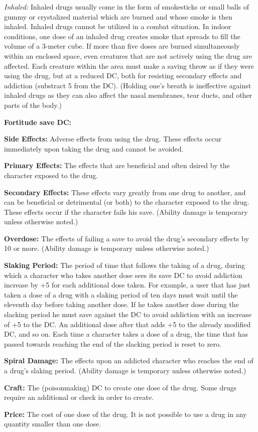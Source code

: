 \textit{Inhaled:} Inhaled drugs usually come in the form of smokesticks or small balls of gummy or crystalized material which are burned and whose smoke is then inhaled. Inhaled drugs cannot be utilized in a combat situation. In indoor conditions, one dose of an inhaled drug creates smoke that spreads to fill the volume of a 3-meter cube. If more than five doses are burned simultaneously within an enclosed space, even creatures that are not actively using the drug are affected. Each creature within the area must make a saving throw as if they were using the drug, but at a reduced DC, both for resisting secondary effects and addiction (substract 5 from the DC). (Holding one’s breath is ineffective against inhaled drugs as they can also affect the nasal membranes, tear ducts, and other parts of the body.)

\textbf{Fortitude save DC: }

\textbf{Side Effects:} Adverse effects from using the drug. These effects occur immediately upon taking the drug and cannot be avoided.

\textbf{Primary Effects:} The effects that are beneficial and often dsired by the character exposed to the drug.

\textbf{Secondary Effects:} These effects vary greatly from one drug to another, and can be beneficial or detrimental (or both) to the character exposed to the drug. These effects occur if the character fails his save. (Ability damage is temporary unless otherwise noted.)

\textbf{Overdose:} The effects of failing a save to avoid the drug’s secondary effects by 10 or more. (Ability damage is temporary unless otherwise noted.)

\textbf{Slaking Period:} The period of time that follows the taking of a drug, during which a character who takes another dose sees its save DC to avoid addiction increase by +5 for each additional dose taken. For example, a user that has just taken a dose of a drug with a slaking period of ten days must wait until the eleventh day before taking another dose. If he takes another dose during the slacking period he must save against the DC to avoid addiction with an increase of +5 to the DC. An additional dose after that adds +5 to the already modified DC, and so on. Each time a character takes a dose of a drug, the time that has passed towards reaching the end of the slacking period is reset to zero.

\textbf{Spiral Damage:} The effects upon an addicted character who reaches the end of a drug’s slaking period. (Ability damage is temporary unless otherwise noted.)

\textbf{Craft:} The  (poisonmaking) DC to create one dose of the drug. Some drugs require an additional  or  check in order to create.

\textbf{Price:} The cost of one dose of the drug. It is not possible to use a drug in any quantity smaller than one dose.